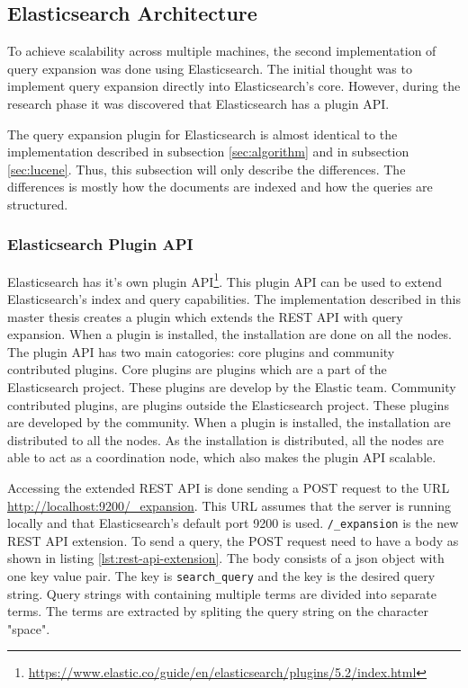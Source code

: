 \subsection{Elasticsearch Architecture}
To achieve scalability across multiple machines,
the second implementation of query expansion was done using Elasticsearch.
The initial thought was to implement query expansion directly into Elasticsearch's core.
However, during the research phase it was discovered that Elasticsearch has a plugin API.

The query expansion plugin for Elasticsearch is almost identical to the implementation described in subsection \ref{sec:algorithm} and in subsection \ref{sec:lucene}.
Thus, this subsection will only describe the differences.
The differences is mostly how the documents are indexed and how the queries are structured.

\subsubsection{Elasticsearch Plugin API}
Elasticsearch has it's own plugin API\footnote{\url{https://www.elastic.co/guide/en/elasticsearch/plugins/5.2/index.html}}.
This plugin API can be used to extend Elasticsearch's index and query capabilities.
The implementation described in this master thesis creates a plugin which extends the REST API with query expansion.
When a plugin is installed, the installation are done on all the nodes.
The plugin API has two main catogories: core plugins and community contributed plugins.
Core plugins are plugins which are a part of the Elasticsearch project.
These plugins are develop by the Elastic team.
Community contributed plugins, are plugins outside the Elasticsearch project.
These plugins are developed by the community.
When a plugin is installed,
the installation are distributed to all the nodes.
As the installation is distributed,
all the nodes are able to act as a coordination node,
which also makes the plugin API scalable.

Accessing the extended REST API is done sending a POST request to the URL \url{http://localhost:9200/_expansion}.
This URL assumes that the server is running locally and that Elasticsearch's default port 9200 is used.
\texttt{/\_expansion} is the new REST API extension.
To send a query, the POST request need to have a body as shown in listing \ref{lst:rest-api-extension}.
The body consists of a json object with one key value pair.
The key is \texttt{search\_query} and the key is the desired query string.
Query strings with containing multiple terms are divided into separate terms.
The terms are extracted by spliting the query string on the character "space".

